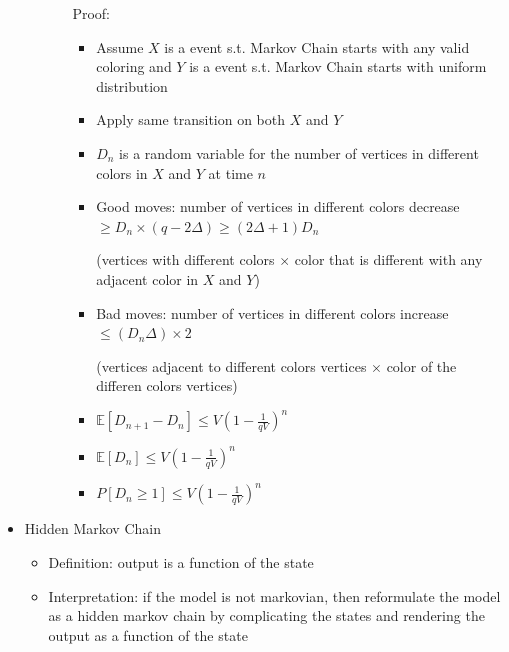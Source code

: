 \documentclass[a4paper]{article}
\begin{document}
\begin{itemize}
\begin{itemize}
\begin{itemize}
                        Proof:
                        \begin{itemize}
                            \item Assume $X$ is a event s.t. Markov Chain starts with any valid coloring and $Y$ is a event s.t. Markov Chain starts with uniform distribution

                            \item Apply same transition on both $X$ and $Y$
                            \item $D_n$ is a random variable for the number of vertices in different colors in $X$ and $Y$ at time $n$

                            \item Good moves: number of vertices in different colors decrease $\geq D_n \times (q-2\Delta) \geq (2\Delta + 1)D_n$

                                (vertices with different colors $\times$ color that is different with any adjacent color in $X$ and $Y$)
                            \item Bad moves: number of vertices in different colors increase $\leq (D_n \Delta) \times 2$

                                (vertices adjacent to different colors vertices $\times$ color of the differen colors vertices)
                            \item $\mathbb{E}[D_{n+1} - D_n] \leq V(1-\frac{1}{qV})^n$ 
                            \item $\mathbb{E}[D_n] \leq V(1-\frac{1}{qV})^n$ 
                            \item $P[D_n \geq 1] \leq V(1-\frac{1}{qV})^n$ 
                        \end{itemize}
                \end{itemize}
        \end{itemize}
    \item Hidden Markov Chain
        \begin{itemize}
            \item Definition: output is a function of the state
            \item Interpretation: if the model is not markovian, then reformulate the model as a hidden markov chain by complicating the states and rendering the output as a function of the state
        \end{itemize}
\end{itemize}
\end{document}
